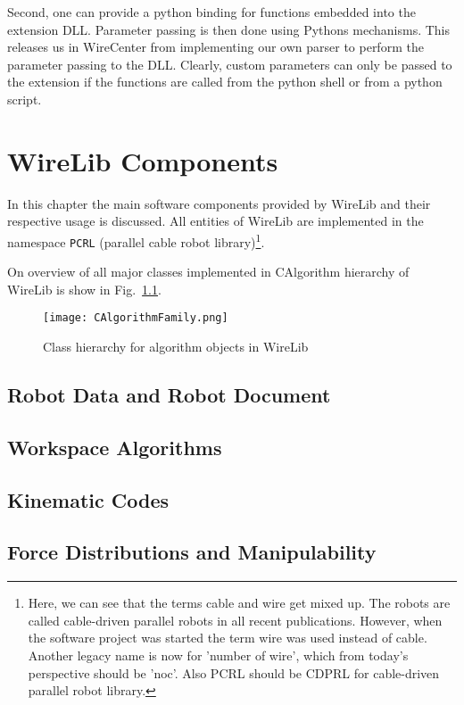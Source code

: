\documentclass[11pt,a4paper,onepage,openany]{book}
\begin{document}
Second, one can provide a python binding for functions embedded into the
extension DLL. Parameter passing is then done using Pythons mechanisms. This
releases us in WireCenter from implementing our own parser to perform the
parameter passing to the DLL. Clearly, custom parameters can only be passed
to
the extension if the functions are called from the python shell or from a
python script.

\chapter{WireLib Components}
In this chapter the main software components provided by WireLib and their
respective usage is discussed. All entities of WireLib are implemented in the
namespace \texttt{PCRL} (parallel cable robot library)\footnote{Here, we can
see that the terms cable and wire get mixed up. The robots are called
cable-driven parallel robots in all recent publications. However, when the
software project was started the term wire was used instead of cable. Another
legacy name is now for 'number of wire', which from today's perspective should
be 'noc'. Also PCRL should be CDPRL for cable-driven parallel robot library.}.

On overview of all major classes implemented in CAlgorithm hierarchy of
WireLib
is show in Fig.~\ref{fig:CAlgorithmHierachy}.
\begin{figure}[t]
  \centering
  \texttt{[image: CAlgorithmFamily.png]}
  \caption{Class hierarchy for algorithm objects in
  WireLib}\label{fig:CAlgorithmHierachy}
\end{figure}

\section{Robot Data and Robot Document}

\section{Workspace Algorithms}

\section{Kinematic Codes}

\section{Force Distributions and Manipulability}
\end{document}
